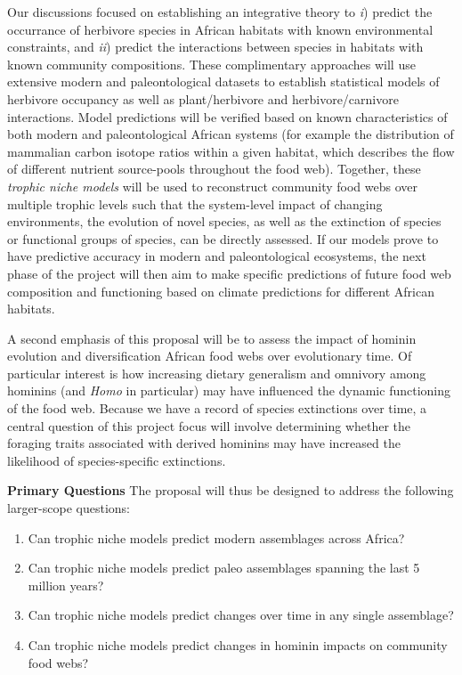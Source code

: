 \documentclass{article}[10pt]
\begin{document}
Our discussions focused on establishing an integrative theory to \emph{i}) predict the occurrance of herbivore species in African habitats with known environmental constraints, and \emph{ii}) predict the interactions between species in habitats with known community compositions.
These complimentary approaches will use extensive modern and paleontological datasets to establish statistical models of herbivore occupancy as well as plant/herbivore and herbivore/carnivore interactions.
Model predictions will be verified based on known characteristics of both modern and paleontological African systems (for example the distribution of mammalian carbon isotope ratios within a given habitat, which describes the flow of different nutrient source-pools throughout the food web).
Together, these \emph{trophic niche models} will be used to reconstruct community food webs over multiple trophic levels such that the system-level impact of changing environments, the evolution of novel species, as well as the extinction of species or functional groups of species, can be directly assessed.
If our models prove to have predictive accuracy in modern and paleontological ecosystems, the next phase of the project will then aim to make specific predictions of future food web composition and functioning based on  climate predictions for different African habitats.

A second emphasis of this proposal will be to assess the impact of hominin evolution and diversification African food webs over evolutionary time.
Of particular interest is how increasing dietary generalism and omnivory among hominins (and \emph{Homo} in particular) may have influenced the dynamic functioning of the food web.
Because we have a record of species extinctions over time, a central question of this project focus will involve determining whether the foraging traits associated with derived hominins may have increased the likelihood of species-specific extinctions.

\vspace{5 mm}

{\bf Primary Questions} The proposal will thus be designed to address the following larger-scope questions:

\begin{enumerate}
	\item Can trophic niche models predict modern assemblages across Africa?
	\item Can trophic niche models predict paleo assemblages spanning the last 5 million years?
	\item Can trophic niche models predict changes over time in any single assemblage?
	\item Can trophic niche models predict changes in hominin impacts on community food webs?
\end{enumerate}
\end{document}
